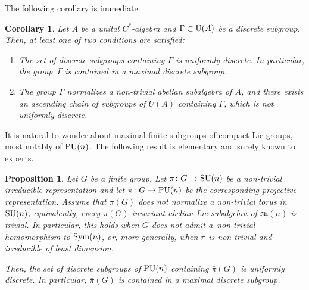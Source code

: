 \documentclass[pdftex]{sigma}
\numberwithin{equation}{section}
\newtheorem{Corollary}[Theorem]{Corollary}
\newtheorem{Proposition}[Theorem]{Proposition}
 { \theoremstyle{definition}
\newtheorem{Definition}[Theorem]{Definition}
\newtheorem{Note}[Theorem]{Note}
\newtheorem{Example}[Theorem]{Example}
\newtheorem{Remark}[Theorem]{Remark}
\newtheorem{Question}[Theorem]{Question} }
\begin{document}
The following corollary is immediate.

{\samepage\begin{Corollary}
Let $A$ be a unital $C^*$-algebra and $\Gamma \subset {\rm U}(A)$ be a discrete subgroup. Then, at least one of two conditions are satisfied:
\begin{enumerate}\itemsep=0pt
 \item[$1.$] The set of discrete subgroups containing $\Gamma$ is uniformly discrete. In particular, the group~$\Gamma$ is contained in a maximal discrete subgroup.
 \item[$2.$] The group $\Gamma$ normalizes a non-trivial abelian subalgebra of $A$, and there exists an ascending chain of subgroups of $U(A)$ containing $\Gamma$, which is not uniformly discrete.
\end{enumerate}
\end{Corollary}

It is natural to wonder about maximal finite subgroups of compact Lie groups, most notably of ${\rm PU}(n)$. The following result is elementary and surely known to experts.

}

\begin{Proposition} \label{compact}
Let $G$ be a finite group. Let $\pi \colon G \to {\rm SU}(n)$ be a non-trivial irreducible representation and let $\bar \pi \colon G \to {\rm PU}(n)$ be the corresponding projective representation. Assume that $\pi(G)$ does not normalize a non-trivial torus in ${\rm SU}(n)$, equivalently, every $\pi(G)$-invariant abelian Lie subalgebra of $\mathfrak{su}(n)$ is trivial.
In particular, this holds when $G$ does not admit a~non-trivial homomorphism to ${\rm Sym}(n)$, or, more generally,
when $\pi$ is non-trivial and irreducible of least dimension.

Then, the set of discrete subgroups of ${\rm PU}(n)$ containing $\bar\pi(G)$ is uniformly discrete. In particular, $\bar\pi(G)$ is contained in a maximal discrete subgroup.
\end{Proposition}
\end{document}
